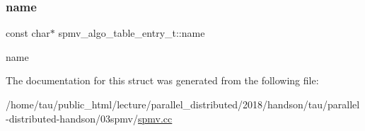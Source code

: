 \subsubsection{\texorpdfstring{name}{name}}
{\footnotesize\ttfamily const char$\ast$ spmv\+\_\+algo\+\_\+table\+\_\+entry\+\_\+t\+::name}

name 

The documentation for this struct was generated from the following file\+:\begin{DoxyCompactItemize}
\item 
/home/tau/public\+\_\+html/lecture/parallel\+\_\+distributed/2018/handson/tau/parallel-\/distributed-\/handson/03spmv/\hyperlink{spmv_8cc}{spmv.\+cc}\end{DoxyCompactItemize}
